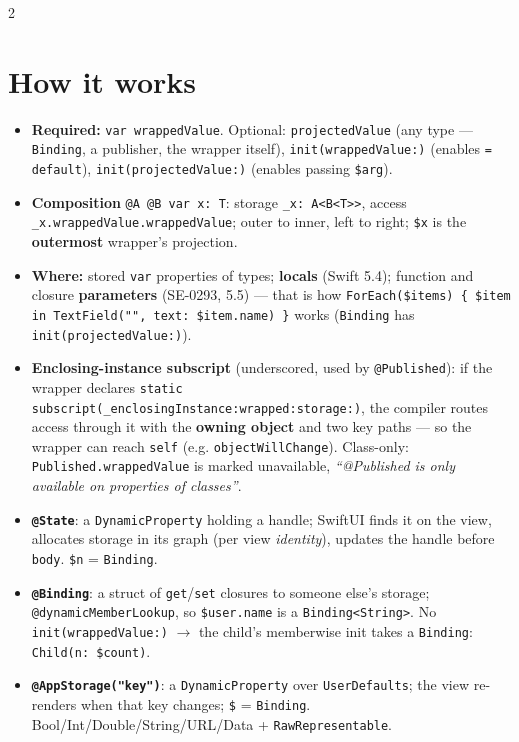 \documentclass[8pt]{extarticle}
\begin{document}
\begin{multicols}{2}
\raggedright

\section{How it works}
\begin{itemize}
  \item \textbf{Required:} \texttt{var wrappedValue}. Optional: \texttt{projectedValue} (any
        type — \texttt{Binding}, a publisher, the wrapper itself),
        \texttt{init(wrappedValue:)} (enables \texttt{= default}),
        \texttt{init(projectedValue:)} (enables passing \texttt{\$arg}).
  \item \textbf{Composition} \texttt{@A @B var x: T}: storage \texttt{\_x: A<B<T>>}, access
        \texttt{\_x.wrappedValue.wrappedValue}; outer to inner, left to right;
        \texttt{\$x} is the \textbf{outermost} wrapper's projection.
  \item \textbf{Where:} stored \texttt{var} properties of types; \textbf{locals} (Swift 5.4);
        function and closure \textbf{parameters} (SE-0293, 5.5) — that is how
        \texttt{ForEach(\$items) \{ \$item in TextField("", text: \$item.name) \}} works
        (\texttt{Binding} has \texttt{init(projectedValue:)}).
  \item \textbf{Enclosing-instance subscript} (underscored, used by \texttt{@Published}):
        if the wrapper declares \texttt{static subscript(\_enclosingInstance:wrapped:storage:)},
        the compiler routes access through it with the \textbf{owning object} and two key
        paths — so the wrapper can reach \texttt{self} (e.g. \texttt{objectWillChange}).
        Class-only: \texttt{Published.wrappedValue} is marked unavailable,
        \emph{``@Published is only available on properties of classes''}.
  \item \textbf{\texttt{@State}}: a \texttt{DynamicProperty} holding a handle; SwiftUI finds it
        on the view, allocates storage in its graph (per view \emph{identity}), updates the
        handle before \texttt{body}. \texttt{\$n} = \texttt{Binding}.
  \item \textbf{\texttt{@Binding}}: a struct of \texttt{get}/\texttt{set} closures to someone
        else's storage; \texttt{@dynamicMemberLookup}, so \texttt{\$user.name} is a
        \texttt{Binding<String>}. No \texttt{init(wrappedValue:)} $\to$ the child's
        memberwise init takes a \texttt{Binding}: \texttt{Child(n: \$count)}.
  \item \textbf{\texttt{@AppStorage("key")}}: a \texttt{DynamicProperty} over
        \texttt{UserDefaults}; the view re-renders when that key changes; \texttt{\$} =
        \texttt{Binding}. Bool/Int/Double/String/URL/Data + \texttt{RawRepresentable}.
\end{itemize}


\end{multicols}
\end{document}
